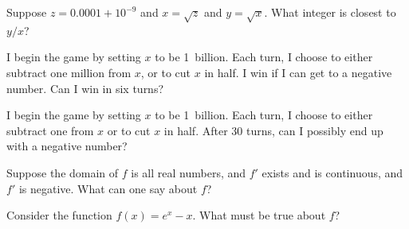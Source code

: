 \documentclass{ximera}
\begin{document}
\begin{shuffle}
\begin{problem}
  Suppose $z = 0.0001 + 10^{-9}$ and $x = \sqrt{z}$ and $y = \sqrt{x}$.  What integer is closest to $y/x$?
  \begin{multipleChoice}
  \end{multipleChoice}
\end{problem}

\begin{problem}
  I begin the game by setting $x$ to be 1~billion.  Each turn, I
  choose to either subtract one million from $x$, or to cut $x$ in
  half.  I win if I can get to a negative number.  Can I win in six
  turns?
  \begin{multipleChoice}
  \end{multipleChoice}
\end{problem}

\begin{problem}
  I begin the game by setting $x$ to be 1~billion.  Each turn, I
  choose to either subtract one from $x$ or to cut $x$ in half.  After
  30 turns, can I possibly end up with a negative number?
  \begin{multipleChoice}
  \end{multipleChoice}
\end{problem}


\begin{problem}
  Suppose the domain of $f$ is all real numbers, and $f'$ exists and is continuous, and $f'$ is negative.  What can one say about $f$?
  \begin{multipleChoice}
  \end{multipleChoice}
\end{problem}

\begin{problem}
  Consider the function $f(x) = e^x - x$.  What must be true about $f$?
  \begin{multipleChoice}
  \end{multipleChoice}
\end{problem}


\end{shuffle}
\end{document}
